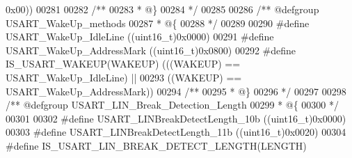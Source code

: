 \begin{DoxyCode}
      0x00\textcolor{preprocessor}{)}\textcolor{preprocessor}{)}
00281 
00282 \textcolor{comment}{/**}
00283 \textcolor{comment}{  * @\}}
00284 \textcolor{comment}{  */}
00285 
00286 \textcolor{comment}{/** @defgroup USART\_WakeUp\_methods}
00287 \textcolor{comment}{  * @\{}
00288 \textcolor{comment}{  */}
00289 
00290 \textcolor{preprocessor}{#}\textcolor{preprocessor}{define} \textcolor{preprocessor}{USART\_WakeUp\_IdleLine}                \textcolor{preprocessor}{(}\textcolor{preprocessor}{(}\textcolor{preprocessor}{uint16\_t}\textcolor{preprocessor}{)}0x0000\textcolor{preprocessor}{)}
00291 \textcolor{preprocessor}{#}\textcolor{preprocessor}{define} \textcolor{preprocessor}{USART\_WakeUp\_AddressMark}             \textcolor{preprocessor}{(}\textcolor{preprocessor}{(}\textcolor{preprocessor}{uint16\_t}\textcolor{preprocessor}{)}0x0800\textcolor{preprocessor}{)}
00292 \textcolor{preprocessor}{#}\textcolor{preprocessor}{define} \textcolor{preprocessor}{IS\_USART\_WAKEUP}\textcolor{preprocessor}{(}\textcolor{preprocessor}{WAKEUP}\textcolor{preprocessor}{)} \textcolor{preprocessor}{(}\textcolor{preprocessor}{(}\textcolor{preprocessor}{(}\textcolor{preprocessor}{WAKEUP}\textcolor{preprocessor}{)} \textcolor{preprocessor}{==} USART_WakeUp_IdleLine\textcolor{preprocessor}{)} \textcolor{preprocessor}{||}
00293                                  \textcolor{preprocessor}{(}\textcolor{preprocessor}{(}\textcolor{preprocessor}{WAKEUP}\textcolor{preprocessor}{)} \textcolor{preprocessor}{==} USART_WakeUp_AddressMark\textcolor{preprocessor}{)}\textcolor{preprocessor}{)}
00294 \textcolor{comment}{/**}
00295 \textcolor{comment}{  * @\}}
00296 \textcolor{comment}{  */}
00297 
00298 \textcolor{comment}{/** @defgroup USART\_LIN\_Break\_Detection\_Length }
00299 \textcolor{comment}{  * @\{}
00300 \textcolor{comment}{  */}
00301 
00302 \textcolor{preprocessor}{#}\textcolor{preprocessor}{define} \textcolor{preprocessor}{USART\_LINBreakDetectLength\_10b}      \textcolor{preprocessor}{(}\textcolor{preprocessor}{(}\textcolor{preprocessor}{uint16\_t}\textcolor{preprocessor}{)}0x0000\textcolor{preprocessor}{)}
00303 \textcolor{preprocessor}{#}\textcolor{preprocessor}{define} \textcolor{preprocessor}{USART\_LINBreakDetectLength\_11b}      \textcolor{preprocessor}{(}\textcolor{preprocessor}{(}\textcolor{preprocessor}{uint16\_t}\textcolor{preprocessor}{)}0x0020\textcolor{preprocessor}{)}
00304 \textcolor{preprocessor}{#}\textcolor{preprocessor}{define} \textcolor{preprocessor}{IS\_USART\_LIN\_BREAK\_DETECT\_LENGTH}\textcolor{preprocessor}{(}\textcolor{preprocessor}{LENGTH}\textcolor{preprocessor}{)}

\end{DoxyCode}
